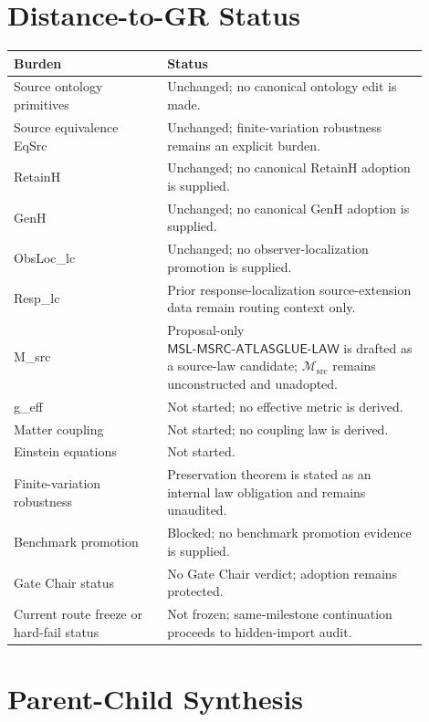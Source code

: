 \documentclass[11pt]{article}
\newcommand{\Msrc}{\mathcal{M}_{\mathrm{src}}}
\newcommand{\MSL}{\mathsf{MSL}\mbox{-}\mathsf{MSRC}\mbox{-}\mathsf{ATLASGLUE}\mbox{-}\mathsf{LAW}}
\begin{document}
\section{Distance-to-GR Status}

\begin{center}
\begin{tabular}{p{0.33\linewidth}p{0.57\linewidth}}
\hline
Burden & Status \\
\hline
Source ontology primitives & Unchanged; no canonical ontology edit is made. \\
Source equivalence EqSrc & Unchanged; finite-variation robustness remains an explicit burden. \\
RetainH & Unchanged; no canonical RetainH adoption is supplied. \\
GenH & Unchanged; no canonical GenH adoption is supplied. \\
ObsLoc\_lc & Unchanged; no observer-localization promotion is supplied. \\
Resp\_lc & Prior response-localization source-extension data remain routing context only. \\
M\_src & Proposal-only \(\MSL\) is drafted as a source-law candidate; \(\Msrc\) remains unconstructed and unadopted. \\
g\_eff & Not started; no effective metric is derived. \\
Matter coupling & Not started; no coupling law is derived. \\
Einstein equations & Not started. \\
Finite-variation robustness & Preservation theorem is stated as an internal law obligation and remains unaudited. \\
Benchmark promotion & Blocked; no benchmark promotion evidence is supplied. \\
Gate Chair status & No Gate Chair verdict; adoption remains protected. \\
Current route freeze or hard-fail status & Not frozen; same-milestone continuation proceeds to hidden-import audit. \\
\hline
\end{tabular}
\end{center}

\section{Parent-Child Synthesis}
\end{document}
